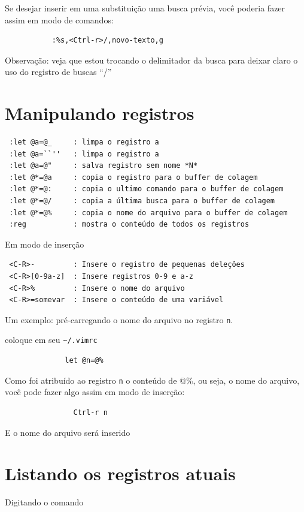 \documentclass[10pt,a4paper,openany]{book}
\begin{document}
Se desejar inserir em uma substituição uma busca prévia, você poderia
fazer assim em modo de comandos:

\begin{verbatim}
		   :%s,<Ctrl-r>/,novo-texto,g
\end{verbatim}

Observação: veja que estou trocando o delimitador da busca para deixar
claro o uso do registro de buscas ``/''

\section{Manipulando registros}
\label{Manipulando registros}

\begin{verbatim}
 :let @a=@_     : limpa o registro a
 :let @a=``''   : limpa o registro a
 :let @a=@"     : salva registro sem nome *N*
 :let @*=@a     : copia o registro para o buffer de colagem
 :let @*=@:     : copia o ultimo comando para o buffer de colagem
 :let @*=@/     : copia a última busca para o buffer de colagem
 :let @*=@%     : copia o nome do arquivo para o buffer de colagem
 :reg           : mostra o conteúdo de todos os registros
\end{verbatim}

Em modo de inserção

\begin{verbatim}
 <C-R>-         : Insere o registro de pequenas deleções
 <C-R>[0-9a-z]  : Insere registros 0-9 e a-z
 <C-R>%         : Insere o nome do arquivo
 <C-R>=somevar  : Insere o conteúdo de uma variável
\end{verbatim}


Um exemplo: pré-carregando o nome do arquivo no registro \verb+n+.

coloque em seu \verb+~/.vimrc+

\begin{verbatim}
			  let @n=@%
\end{verbatim}

Como foi atribuído ao registro \verb+n+ o conteúdo de @\%, ou seja, o nome
do arquivo, você pode fazer algo assim em modo de inserção:

\begin{verbatim}
				Ctrl-r n
\end{verbatim}

E o nome do arquivo será inserido

\section{Listando os registros atuais}
\label{Listando os registros atuais}
Digitando o comando
\end{document}
